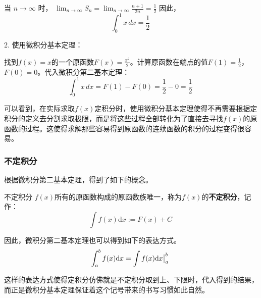当 $ n \to \infty $ 时，
$\lim_{n \to \infty} S_n = \lim_{n \to \infty} \frac{n+1}{2n}= \frac{1}{2}$
因此，
\begin{equation}
\int_0^1 x \, dx = \frac{1}{2}~
\end{equation}


2. 使用微积分基本定理：

找到$f(x) = x$的一个原函数$F(x)=\frac{x^2}{2}$。计算原函数在端点的值$F(1) =\frac{1}{2}$，$F(0) = 0$。代入微积分第二基本定理：
\begin{equation}
\int_0^1 x \, dx = F(1) - F(0) = \frac{1}{2} - 0 = \frac{1}{2}~
\end{equation}


可以看到，在实际求取$f(x)$定积分时，使用微积分基本定理使得不再需要根据定积分的定义去分割求取极限，而是将这些过程全部转化为了直接去寻找$f(x)$的原函数的过程。这使得求解那些容易得到原函数的连续函数的积分的过程变得很容易。

\subsubsection{不定积分}

根据微积分第二基本定理，得到了如下的概念。

\begin{definition}{不定积分}
$f(x)$所有的原函数构成的原函数族唯一，称为$f(x)$的\textbf{不定积分}，记作：
\begin{equation}
\int f(x)\mathrm {d}x:=F(x)+C~
\end{equation}

\end{definition}

因此，微积分第二基本定理也可以得到如下的表达方式。
\begin{equation}
\int_{a}^{b} f(x)\mathrm {d}x=\int f(x)\mathrm {d}x\big{|}_{a}^{b}~
\end{equation}

这样的表达方式使得定积分仿佛就是不定积分取到上、下限时，代入得到的结果，而正是微积分基本定理保证着这个记号带来的书写习惯如此自然。